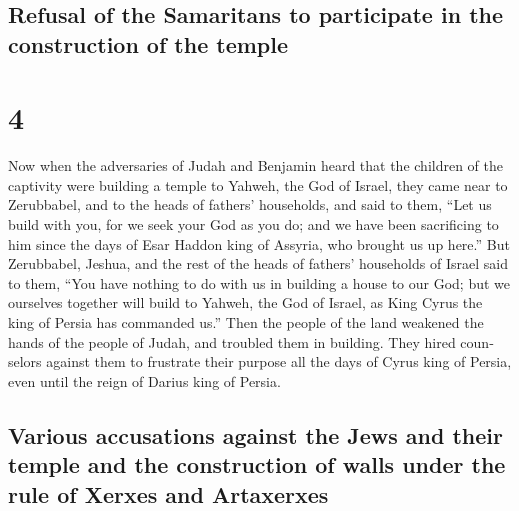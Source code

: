 \begin{paracol}{2}
\switchcolumn
\begin{otherlanguage}{english}

\hypertarget{refusal-of-the-samaritans-to-participate-in-the-construction-of-the-temple}{%
\subsection{Refusal of the Samaritans to participate in the construction
of the
temple}\label{refusal-of-the-samaritans-to-participate-in-the-construction-of-the-temple}}

\hypertarget{section-7}{%
\section{4}\label{section-7}}

 Now when the adversaries of Judah and Benjamin heard that
the children of the captivity were building a temple to Yahweh, the God
of Israel,  they came near to Zerubbabel, and to the heads
of fathers' households, and said to them, ``Let us build with you, for
we seek your God as you do; and we have been sacrificing to him since
the days of Esar Haddon king of Assyria, who brought us up here.''
 But Zerubbabel, Jeshua, and the rest of the heads of
fathers' households of Israel said to them, ``You have nothing to do
with us in building a house to our God; but we ourselves together will
build to Yahweh, the God of Israel, as King Cyrus the king of Persia has
commanded us.''  Then the people of the land weakened the
hands of the people of Judah, and troubled them in building.
 They hired counselors against them to frustrate their
purpose all the days of Cyrus king of Persia, even until the reign of
Darius king of Persia.

\hypertarget{various-accusations-against-the-jews-and-their-temple-and-the-construction-of-walls-under-the-rule-of-xerxes-and-artaxerxes}{%
\subsection{Various accusations against the Jews and their temple and
the construction of walls under the rule of Xerxes and
Artaxerxes}\label{various-accusations-against-the-jews-and-their-temple-and-the-construction-of-walls-under-the-rule-of-xerxes-and-artaxerxes}}


\end{otherlanguage}
\end{paracol}
